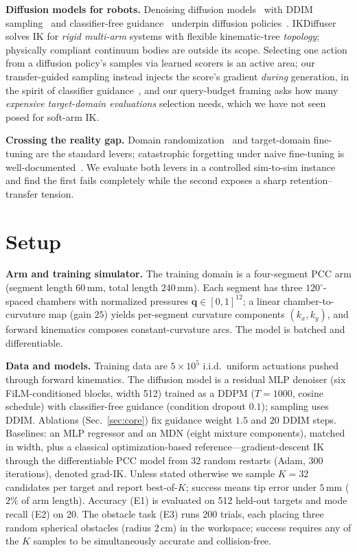 \textbf{Diffusion models for robots.} Denoising diffusion
models~\cite{ho2020denoising} with DDIM sampling~\cite{song2021denoising} and
classifier-free guidance~\cite{ho2022classifier} underpin diffusion
policies~\cite{chi2023diffusion}. IKDiffuser~\cite{zhang2025ikdiffuser}
solves IK for \emph{rigid multi-arm} systems with flexible kinematic-tree
\emph{topology}; physically compliant continuum bodies are outside its scope.
Selecting one action from a diffusion policy's samples via learned scorers is
an active area; our transfer-guided sampling instead injects the score's
gradient \emph{during} generation, in the spirit of classifier
guidance~\cite{dhariwal2021diffusion}, and our query-budget framing asks how
many \emph{expensive target-domain evaluations} selection needs, which we
have not seen posed for soft-arm IK.

\textbf{Crossing the reality gap.} Domain
randomization~\cite{tobin2017domain} and target-domain fine-tuning are the
standard levers; catastrophic forgetting under naive fine-tuning is
well-documented~\cite{kirkpatrick2017overcoming}. We evaluate both levers in
a controlled sim-to-sim instance and find the first fails completely while
the second exposes a sharp retention--transfer tension.

\section{Setup}
\label{sec:setup}

\textbf{Arm and training simulator.} The training domain is a four-segment
PCC arm (segment length $60\,$mm, total length $240\,$mm). Each segment has
three $120^\circ$-spaced chambers with normalized pressures
$\mathbf{q}\in[0,1]^{12}$; a linear chamber-to-curvature map (gain $25$)
yields per-segment curvature components $(k_x,k_y)$, and forward kinematics
composes constant-curvature arcs. The model is batched and differentiable.

\textbf{Data and models.} Training data are $5\times10^5$ i.i.d.\ uniform
actuations pushed through forward kinematics. The diffusion model is a
residual MLP denoiser (six FiLM-conditioned blocks, width 512) trained as a
DDPM ($T{=}1000$, cosine schedule) with classifier-free guidance
(condition dropout $0.1$); sampling uses DDIM. Ablations
(Sec.~\ref{sec:core}) fix guidance weight $1.5$ and $20$ DDIM steps.
Baselines: an MLP regressor and an MDN (eight mixture components), matched
in width, plus a classical optimization-based reference---gradient-descent
IK through the differentiable PCC model from 32 random restarts (Adam, 300
iterations), denoted grad-IK. Unless stated otherwise we sample $K{=}32$
candidates per target and report best-of-$K$; success means tip error under
$5\,$mm ($2\%$ of arm length). Accuracy (E1) is evaluated on 512 held-out
targets and mode recall (E2) on 20. The obstacle task (E3) runs 200 trials, each placing three random
spherical obstacles (radius $2\,$cm) in the workspace; success requires any
of the $K$ samples to be simultaneously accurate and collision-free.

